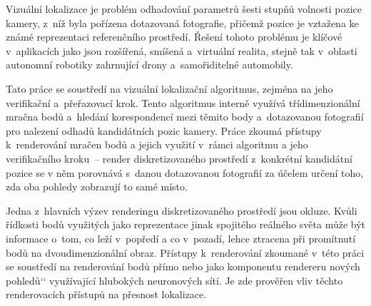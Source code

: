 \documentclass[12pt]{report}
\providecommand{\uv}[1]{\raisebox{-1.3ex}{’’}#1‘‘}
\begin{document}
Vizuální lokalizace je problém odhadování parametrů šesti stupňů volnosti
pozice kamery, z~níž byla pořízena dotazovaná fotografie, přičemž pozice
je vztažena ke známé reprezentaci referenčního prostředí. Řešení tohoto
problému je klíčové v~aplikacích jako jsou rozšířená, smíšená a~virtuální
realita, stejně tak v~oblasti autonomní robotiky zahrnující drony
a~samořiditelné automobily.

Tato práce se soustředí na vizuální lokalizační algoritmus, zejména na
jeho verifikační a~přeřazovací krok. Tento algoritmus interně využívá
třídimenzionální mračna bodů a~hledání korespondencí mezi těmito body
a~dotazovanou fotografií pro nalezení odhadů kandidátních pozic kamery.
Práce zkoumá přístupy k~renderování mračen bodů a jejich využití v~rámci
algoritmu a jeho verifikačního kroku~-- render diskretizovaného prostředí
z~konkrétní kandidátní pozice se v něm porovnává s~danou dotazovanou fotografií
za účelem určení toho, zda oba pohledy zobrazují to samé místo.

Jedna z~hlavních výzev renderingu diskretizovaného prostředí jsou okluze.
Kvůli řídkosti bodů využitých jako reprezentace jinak spojitého reálného
světa může být informace o~tom, co leží v~popředí a co v~pozadí, lehce
ztracena při promítnutí bodů na dvoudimenzionální obraz. Přístupy
k~renderování zkoumané v~této práci se soustředí na renderování bodů přímo
nebo jako komponentu rendereru \uv{nových pohledů} využívající hlubokých
neuronových sítí. Je zde prověřen vliv těchto renderovacích přístupů na
přesnost lokalizace.
\end{document}
